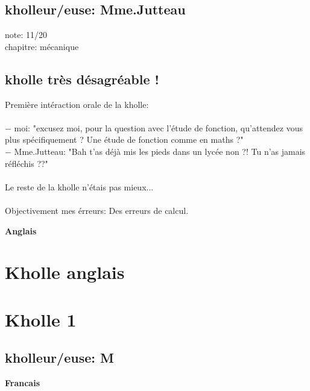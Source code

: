 \documentclass{article}
\begin{document}
\subsection{kholleur/euse: Mme.Jutteau}

note: 11/20 \\
chapitre: mécanique

\subsection{kholle très désagréable !} 

Première intéraction orale de la kholle: \\ \\

$-$ moi: "excusez moi, pour la question avec l'étude de fonction, qu'attendez vous plus spécifiquement ? Une étude de fonction comme en maths ?" \\

$-$ Mme.Jutteau: "Bah t'as déjà mis les pieds dans un lycée non ?! Tu n'as jamais réfléchis ??" \\ \\
Le reste de la kholle n'étais pas mieux... \\ \\

Objectivement mes érreurs: Des erreurs de calcul.


\vspace{5mm}

\begin{center}
\textbf{\large Anglais}
\end{center} \vspace{0.2cm}

\section{Kholle anglais}

\section{Kholle 1}
\subsection{kholleur/euse: M}


\begin{center}
\textbf{\large Francais}
\end{center} \vspace{0.2cm}
\end{document}
